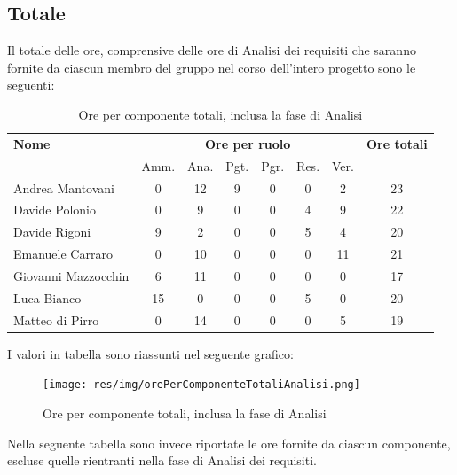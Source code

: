 \pagebreak
\subsection{Totale}
Il totale delle ore, comprensive delle ore di Analisi dei requisiti che saranno fornite da ciascun membro
del gruppo nel corso dell’intero progetto sono le seguenti:

\begin{table}[H]
\begin{tabular}{lccccccc}
\toprule
    \textbf{Nome}  & \multicolumn{6}{c}{\textbf{Ore per ruolo}} & \textbf{Ore totali} \\
     & Amm. & Ana. & Pgt. & Pgr. & Res. & Ver. & \\
    \midrule
    
	Andrea Mantovani & 0 & 12 & 9 & 0 & 0 & 2 & 23 \\
	Davide Polonio & 0 & 9 & 0 & 0 & 4 & 9 & 22 \\
	Davide Rigoni & 9 & 2 & 0 & 0 & 5 & 4 & 20 \\
	Emanuele Carraro & 0 & 10 & 0 & 0 & 0 & 11 & 21 \\
	Giovanni Mazzocchin & 6 & 11 & 0 & 0 & 0 & 0 & 17 \\
	Luca Bianco & 15 & 0 & 0 & 0 & 5 & 0 & 20 \\
	Matteo di Pirro & 0 & 14 & 0 & 0 & 0 & 5 & 19 \\
    
    \bottomrule
\end{tabular}
\caption{Ore per componente totali, inclusa la fase di Analisi}
\end{table}

I valori in tabella sono riassunti nel seguente grafico: \\ 

    \begin{figure}[H]
      \begin{center}
        \texttt{[image: res/img/orePerComponenteTotaliAnalisi.png]}
      \caption{Ore per componente totali, inclusa la fase di Analisi}
      \end{center} 
    \end{figure}    
    
Nella seguente tabella sono invece riportate le ore fornite da ciascun componente, escluse quelle rientranti nella fase di Analisi dei requisiti.

